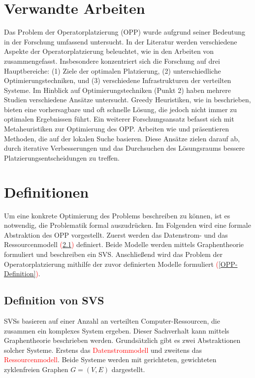 \documentclass{article}
\begin{document}
\section{Verwandte Arbeiten}
Das Problem der Operatorplatzierung (OPP) wurde aufgrund seiner Bedeutung in der Forschung umfassend untersucht. 
In der Literatur werden verschiedene Aspekte der Operatorplatzierung beleuchtet, wie in den Arbeiten von \cite{survey-placement-strategies,Starks2018} zusammengefasst. 
Insbesondere konzentriert sich die Forschung auf drei Hauptbereiche: (1) Ziele der optimalen Platzierung, (2) unterschiedliche Optimierungstechniken, und (3) verschiedene Infrastrukturen der verteilten Systeme.
Im Hinblick auf Optimierungstechniken (Punkt 2) haben mehrere Studien verschiedene Ansätze untersucht. 
Greedy Heuristiken, wie in \cite{greedy-distr.-svs} beschrieben, bieten eine vorhersagbare und oft schnelle Lösung, die jedoch nicht immer zu optimalen Ergebnissen führt.
Ein weiterer Forschungsansatz befasst sich mit Metaheuristiken zur Optimierung des OPP. 
Arbeiten wie \cite{whiteWater} und \cite{latency-estimation-local-search} präsentieren Methoden, die auf der lokalen Suche basieren. Diese Ansätze zielen darauf ab, durch iterative Verbesserungen und das Durchsuchen des Lösungsraums bessere Platzierungsentscheidungen zu treffen.


\section{Definitionen}
Um eine konkrete Optimierung des Problems beschreiben zu können, ist es notwendig, die Problematik formal auszudrücken. 
Im Folgenden wird eine formale Abstraktion des OPP vorgestellt. 
Zuerst werden das Datenstrom- und das Ressourcenmodell \textcolor{red}{(}\ref{SVS-Definition}\textcolor{red}{)} definiert. 
Beide Modelle werden mittels Graphentheorie formuliert und beschreiben ein SVS. 
Anschließend wird das Problem der Operatorplatzierung mithilfe der zuvor definierten Modelle formuliert \textcolor{red}{(}\ref{OPP-Definition}\textcolor{red}{)}.


\subsection{Definition von SVS}  \label{SVS-Definition}  %
SVSs basieren auf einer Anzahl an verteilten Computer-Ressourcen, die zusammen ein komplexes System ergeben. 
Dieser Sachverhalt kann mittels Graphentheorie beschrieben werden. Grundsätzlich gibt es zwei Abstraktionen solcher Systeme. 
Erstens das \textcolor{red}{Datenstrommodell} und zweitens das \textcolor{red}{Ressourcenmodell}. 
Beide Systeme werden mit gerichteten, gewichteten zyklenfreien Graphen $G = (V,E)$ dargestellt. \\
\end{document}
